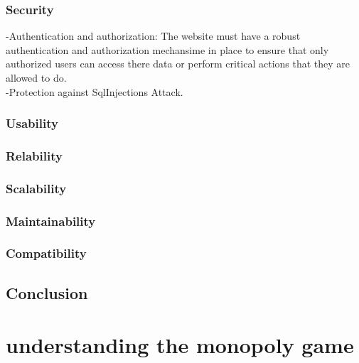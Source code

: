 \documentclass{article}
\begin{document}
\subsubsection{Security}
-Authentication and authorization: The website must have a robust authentication and authorization mechansime in place to ensure that only authorized users can access there data or perform critical actions that they are allowed to do.\\
-Protection against SqlInjections Attack.\\
\subsubsection{Usability}
\subsubsection{Relability}
\subsubsection{Scalability}
\subsubsection{Maintainability}
\subsubsection{Compatibility}

\subsection{Conclusion}

\cleardoublepage
\section {understanding the monopoly game}
\end{document}
